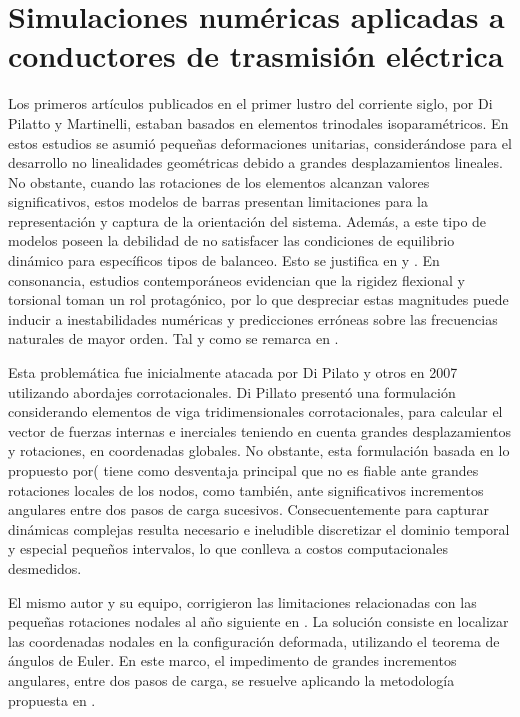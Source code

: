 \section{Simulaciones numéricas aplicadas a conductores de trasmisión eléctrica}\label{Sec:EA:AplicadasConductores}
Los primeros artículos publicados en el primer lustro del corriente siglo, por Di Pilatto y Martinelli, estaban basados en elementos trinodales isoparamétricos. En estos estudios se asumió pequeñas deformaciones unitarias, considerándose para el desarrollo no linealidades geométricas debido a grandes desplazamientos lineales. No obstante, cuando las rotaciones de los elementos alcanzan valores significativos, estos modelos de barras presentan limitaciones para la representación y captura de la orientación del sistema. Además, a este tipo de modelos poseen la debilidad de no satisfacer las condiciones de equilibrio dinámico para específicos tipos de balanceo. Esto se justifica en \cite{martinelli2001numerical} y \cite{Martinelli2004}. En consonancia, estudios contemporáneos evidencian que la rigidez flexional y torsional toman un rol protagónico, por lo que despreciar estas magnitudes puede inducir a inestabilidades numéricas y predicciones erróneas sobre las frecuencias naturales de mayor orden. Tal y como se remarca en \cite{koh2004dynamic}.

Esta problemática fue inicialmente atacada por Di Pilato y otros en 2007 utilizando abordajes corrotacionales. Di Pillato presentó una formulación considerando elementos de viga tridimensionales corrotacionales, para calcular el vector de fuerzas internas e inerciales teniendo en cuenta grandes desplazamientos y rotaciones, en coordenadas globales. No obstante, esta formulación basada en lo propuesto por(\cite{oran1973tangent} tiene como desventaja principal que no es fiable ante grandes rotaciones locales de los nodos, como también, ante significativos incrementos angulares entre dos pasos de carga sucesivos. Consecuentemente para capturar dinámicas complejas resulta necesario e ineludible discretizar el dominio temporal y especial pequeños intervalos, lo que conlleva a costos computacionales desmedidos.

El mismo autor y su equipo, corrigieron las limitaciones relacionadas con las pequeñas rotaciones nodales al año siguiente en \cite{di2008corotational}. La solución consiste en localizar las coordenadas nodales en la configuración deformada, utilizando el teorema de ángulos de Euler. En este marco, el impedimento de grandes incrementos angulares, entre dos pasos de carga, se resuelve aplicando la metodología propuesta en \cite{simo1988dynamics}.  

